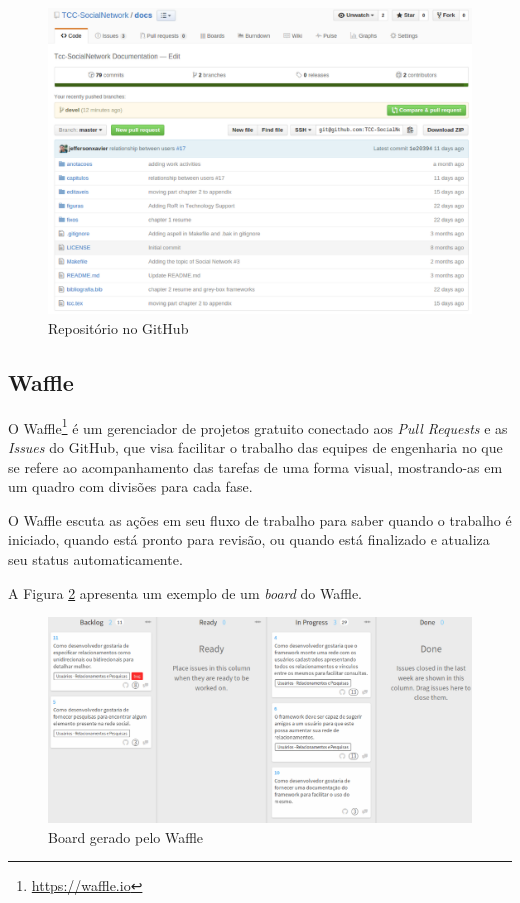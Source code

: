 \begin{apendicesenv}
\begin{figure}[!h]
	\centering
	\includegraphics[scale=0.35]{figuras/capitulo3/github.eps}
	\caption{Repositório no GitHub}
	\label{github}
\end{figure}

\subsection{Waffle}

O Waffle\footnote{\url{https://waffle.io}} é um gerenciador de projetos gratuito conectado aos \textit{Pull Requests} e as \textit{Issues} do GitHub, que visa facilitar o trabalho das equipes de engenharia no que se refere ao acompanhamento das tarefas de uma forma visual, mostrando-as em um quadro com divisões para cada fase.

O Waffle escuta as ações em seu fluxo de trabalho para saber quando o trabalho é iniciado, quando está pronto para revisão, ou quando está finalizado e atualiza seu status automaticamente.

A Figura \ref{waffle} apresenta um exemplo de um \textit{board} do Waffle.

\newpage

\begin{figure}[!h]
	\centering
	\includegraphics[scale=0.3]{figuras/capitulo3/waffle.eps}
	\caption{Board gerado pelo Waffle}
	\label{waffle}
\end{figure}


\end{apendicesenv}
